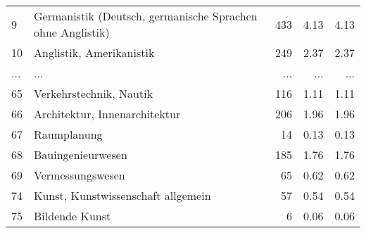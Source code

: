 \begin{longtable}{lXrrr}
        9 & \multicolumn{1}{X}{Germanistik (Deutsch, germanische Sprachen ohne Anglistik)} & %
          \num{433} &
          \num[round-mode=places,round-precision=2]{4.13} &
          \num[round-mode=places,round-precision=2]{4.13} \\
        10 & \multicolumn{1}{X}{Anglistik, Amerikanistik} & %
          \num{249} &
          \num[round-mode=places,round-precision=2]{2.37} &
          \num[round-mode=places,round-precision=2]{2.37} \\
       ... & ... & ... & ... & ... \\
        65 & \multicolumn{1}{X}{Verkehrstechnik, Nautik} & %
          \num{116} &
          \num[round-mode=places,round-precision=2]{1.11} &
          \num[round-mode=places,round-precision=2]{1.11} \\

        66 & \multicolumn{1}{X}{Architektur, Innenarchitektur} & %
          \num{206} &
          \num[round-mode=places,round-precision=2]{1.96} &
          \num[round-mode=places,round-precision=2]{1.96} \\

        67 & \multicolumn{1}{X}{Raumplanung} & %
          \num{14} &
          \num[round-mode=places,round-precision=2]{0.13} &
          \num[round-mode=places,round-precision=2]{0.13} \\

        68 & \multicolumn{1}{X}{Bauingenieurwesen} & %
          \num{185} &
          \num[round-mode=places,round-precision=2]{1.76} &
          \num[round-mode=places,round-precision=2]{1.76} \\

        69 & \multicolumn{1}{X}{Vermessungswesen} & %
          \num{65} &
          \num[round-mode=places,round-precision=2]{0.62} &
          \num[round-mode=places,round-precision=2]{0.62} \\

        74 & \multicolumn{1}{X}{Kunst, Kunstwissenschaft allgemein} & %
          \num{57} &
          \num[round-mode=places,round-precision=2]{0.54} &
          \num[round-mode=places,round-precision=2]{0.54} \\

        75 & \multicolumn{1}{X}{Bildende Kunst} & %
          \num{6} &
          \num[round-mode=places,round-precision=2]{0.06} &
          \num[round-mode=places,round-precision=2]{0.06} \\


\end{longtable}
